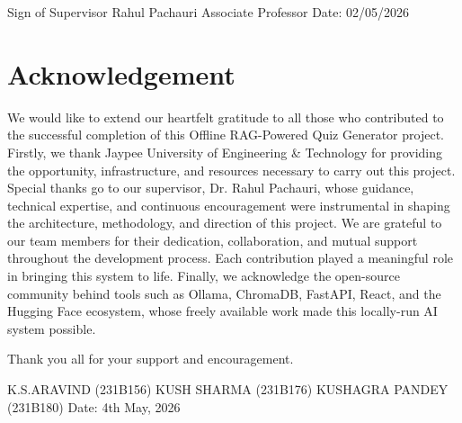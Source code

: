 \documentclass[12pt,a4paper]{report}
\begin{document}
Sign of Supervisor
Rahul Pachauri
Associate Professor
Date: 02/05/2026
















\chapter*{Acknowledgement}
We would like to extend our heartfelt gratitude to all those who contributed to the successful completion of this Offline RAG-Powered Quiz Generator project.
Firstly, we thank Jaypee University of Engineering \& Technology for providing the opportunity, infrastructure, and resources necessary to carry out this project.
Special thanks go to our supervisor, Dr. Rahul Pachauri, whose guidance, technical expertise, and continuous encouragement were instrumental in shaping the architecture, methodology, and direction of this project.
We are grateful to our team members for their dedication, collaboration, and mutual support throughout the development process. Each contribution played a meaningful role in bringing this system to life.
Finally, we acknowledge the open-source community behind tools such as Ollama, ChromaDB, FastAPI, React, and the Hugging Face ecosystem, whose freely available work made this locally-run AI system possible.


Thank you all for your support and encouragement.




K.S.ARAVIND (231B156)
KUSH SHARMA (231B176)
KUSHAGRA PANDEY (231B180)
Date: 4th May, 2026
\end{document}
